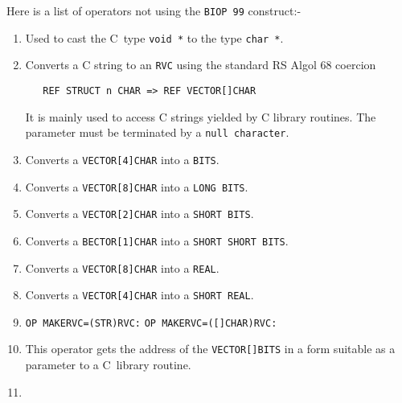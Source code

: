 Here is a list of operators not using the \verb|BIOP 99|
construct:-
\begin{enumerate}
\item {}\newline
Used to cast the C~type \verb|void *| to the type \verb|char *|.
\item {}\newline
Converts a C string to an \verb|RVC| using the standard
RS Algol 68 coercion
\begin{verbatim}
   REF STRUCT n CHAR => REF VECTOR[]CHAR
\end{verbatim}
\noindent
It is mainly used to access C strings yielded by C library routines.
The parameter must be terminated by a \verb|null character|.
\item {}\newline
Converts a \verb|VECTOR[4]CHAR| into a \verb|BITS|.
\item {}\newline
Converts a \verb|VECTOR[8]CHAR| into a \verb|LONG BITS|.
\item {}\newline
Converts a \verb|VECTOR[2]CHAR| into a \verb|SHORT BITS|.
\item {}\newline
Converts a \verb|BECTOR[1]CHAR| into a \verb|SHORT SHORT BITS|.
\item {}\newline
Converts a \verb|VECTOR[8]CHAR| into a \verb|REAL|.
\item {}\newline
Converts a \verb|VECTOR[4]CHAR| into a \verb|SHORT REAL|.
\item {}\newline
\verb|OP MAKERVC=(STR)RVC:|\newline
\verb|OP MAKERVC=([]CHAR)RVC:|
\item {}\newline
This operator gets the address of the \verb|VECTOR[]BITS| in a form
suitable as a parameter to a C~library routine.
\item {}\newline

\end{enumerate}
